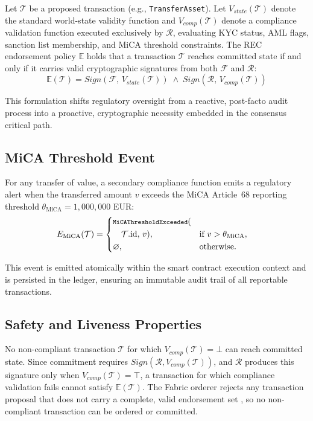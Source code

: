 \documentclass[journal,10pt,twocolumn]{IEEEtran}
\begin{document}
Let $\mathcal{T}$ be a proposed transaction (e.g., \texttt{TransferAsset}). Let $V_{state}(\mathcal{T})$ denote the standard world-state validity function and $V_{comp}(\mathcal{T})$ denote a compliance validation function executed exclusively by $\mathcal{R}$, evaluating KYC status, AML flags, sanction list membership, and MiCA threshold constraints. The REC endorsement policy $\mathbb{E}$ holds that a transaction $\mathcal{T}$ reaches committed state if and only if it carries valid cryptographic signatures from both $\mathcal{F}$ and $\mathcal{R}$:
\begin{equation*}
\mathbb{E}(\mathcal{T}) = \textit{Sign}(\mathcal{F},\, V_{state}(\mathcal{T})) \;\wedge\; \textit{Sign}(\mathcal{R},\, V_{comp}(\mathcal{T}))
\end{equation*}

This formulation shifts regulatory oversight from a reactive, post-facto audit process into a proactive, cryptographic necessity embedded in the consensus critical path.

\subsection{MiCA Threshold Event}

For any transfer of value, a secondary compliance function emits a regulatory alert when the transferred amount $v$ exceeds the MiCA Article~68 reporting threshold $\theta_{\text{MiCA}} = 1{,}000{,}000$ EUR:
\[
E_{\text{MiCA}}(\mathcal{T}) =
\left\{
\begin{aligned}
&\text{\ttfamily\footnotesize MiCAThresholdExceeded}(\\
&\quad \mathcal{T}.\mathrm{id},\, v), && \text{if } v > \theta_{\text{MiCA}}, \\
&\varnothing, && \text{otherwise.}
\end{aligned}
\right.
\]

This event is emitted atomically within the smart contract execution context and is persisted in the ledger, ensuring an immutable audit trail of all reportable transactions.

\subsection{Safety and Liveness Properties}

No non-compliant transaction $\mathcal{T}$ for which $V_{comp}(\mathcal{T}) = \bot$ can reach committed state. Since commitment requires $\textit{Sign}(\mathcal{R}, V_{comp}(\mathcal{T}))$, and $\mathcal{R}$ produces this signature only when $V_{comp}(\mathcal{T}) = \top$, a transaction for which compliance validation fails cannot satisfy $\mathbb{E}(\mathcal{T})$. The Fabric orderer rejects any transaction proposal that does not carry a complete, valid endorsement set \cite{ref:fabric}, so no non-compliant transaction can be ordered or committed.
\end{document}
